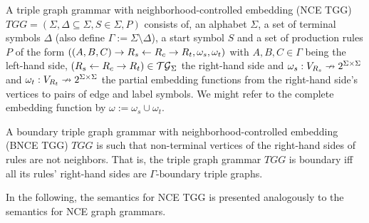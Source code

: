 \documentclass[]{report}
\begin{document}
\begin{definition}
	A triple graph grammar with neighborhood-controlled embedding (NCE TGG) $TGG = (\Sigma, \Delta \subseteq \Sigma, S \in \Sigma, P)$ consists of, an alphabet $\Sigma$, a set of terminal symbols $\Delta$ (also define $\Gamma := \Sigma \setminus \Delta$), a start symbol $S$ and a set of production rules $P$ of the form $((A,B,C) \to R_s \overset{}{\leftarrow} R_c \overset{}{\rightarrow} R_t, \omega_s, \omega_t)$ with $A,B,C \in \Gamma$ being the left-hand side, $(R_s \overset{}{\leftarrow} R_c \overset{}{\rightarrow} R_t) \in \mathcal{TG}_{\Sigma}$ the right-hand side and $\omega_s : V_{R_s} \nrightarrow 2^{\Sigma \times \Sigma}$ and $\omega_t : V_{R_t} \nrightarrow 2^{\Sigma \times \Sigma}$ the partial embedding functions from the right-hand side's vertices to pairs of edge and label symbols. We might refer to the complete embedding function by $\omega:= \omega_s \cup \omega_t$.
\end{definition}

\begin{definition}
	A boundary triple graph grammar with neighborhood-controlled embedding (BNCE TGG) $TGG$ is such that non-terminal vertices of the right-hand sides of rules are not neighbors. That is, the triple graph grammar $TGG$ is boundary iff all its rules' right-hand sides are $\Gamma\text{-boundary}$ triple graphs.
\end{definition}


In the following, the semantics for NCE TGG is presented analogously to the semantics for NCE graph grammars.
\end{document}

